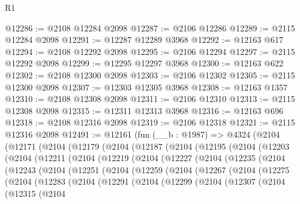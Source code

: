 \begin{lexlean}{R1}
\begin{coremodule}
@12286 := @2108 @12284 @2098
@12287 := @2106 @12286
@12289 := @2115 @12284 @2098
@12291 := @12287 @12289 @3968
@12292 := @12163 @617
@12294 := @2108 @12292 @2098
@12295 := @2106 @12294
@12297 := @2115 @12292 @2098
@12299 := @12295 @12297 @3968
@12300 := @12163 @622
@12302 := @2108 @12300 @2098
@12303 := @2106 @12302
@12305 := @2115 @12300 @2098
@12307 := @12303 @12305 @3968
@12308 := @12163 @1357
@12310 := @2108 @12308 @2098
@12311 := @2106 @12310
@12313 := @2115 @12308 @2098
@12315 := @12311 @12313 @3968
@12316 := @12163 @696
@12318 := @2108 @12316 @2098
@12319 := @2106 @12318
@12321 := @2115 @12316 @2098
@12491 := @12161
    (fun (__b : @1987) =>
    @4324
      (@2104
        (@12171
          (@2104
            (@12179
              (@2104
                (@12187
                  (@2104
                    (@12195
                      (@2104
                        (@12203
                          (@2104
                            (@12211
                              (@2104
                                (@12219
                                  (@2104
                                    (@12227
                                      (@2104
                                        (@12235
                                          (@2104
                                            (@12243
                                              (@2104
                                                (@12251
                                                  (@2104
                                                    (@12259
                                                      (@2104
                                                        (@12267
                                                          (@2104
                                                            (@12275
                                                              (@2104
                                                                (@12283
                                                                  (@2104
                                                                    (@12291
                                                                      (@2104
                                                                        (@12299
                                                                          (@2104
                                                                            (@12307
                                                                              (@2104
                                                                                (@12315
                                                                                  (@2104

\end{coremodule}
\end{lexlean}
